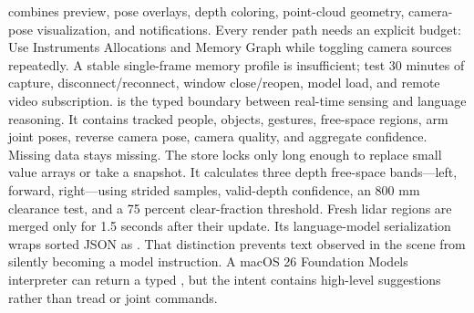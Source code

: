 \markdownRendererInterblockSeparator
{} combines preview, pose overlays, depth coloring, point-cloud geometry, camera-pose visualization, and notifications. Every render path needs an explicit budget:\markdownRendererInterblockSeparator
{}\markdownRendererInterblockSeparator
{}Use Instruments Allocations and Memory Graph while toggling camera sources repeatedly. A stable single-frame memory profile is insufficient; test 30 minutes of capture, disconnect/reconnect, window close/reopen, model load, and remote video subscription.\markdownRendererInterblockSeparator
{}
\markdownRendererSectionEnd \markdownRendererSectionBegin
{}\markdownRendererInterblockSeparator
{} is the typed boundary between real-time sensing and language reasoning. It contains tracked people, objects, gestures, free-space regions, arm joint poses, reverse camera pose, camera quality, and aggregate confidence. Missing data stays missing.\markdownRendererParagraphSeparator
{}The store locks only long enough to replace small value arrays or take a snapshot. It calculates three depth free-space bands—left, forward, right—using strided samples, valid-depth confidence, an 800 mm clearance test, and a 75 percent clear-fraction threshold. Fresh lidar regions are merged only for 1.5 seconds after their update.\markdownRendererParagraphSeparator
{}Its language-model serialization wraps sorted JSON as . That distinction prevents text observed in the scene from silently becoming a model instruction. A macOS 26 Foundation Models interpreter can return a typed , but the intent contains high-level suggestions rather than tread or joint commands.\markdownRendererInterblockSeparator
